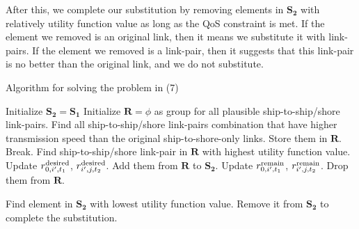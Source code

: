 \documentclass[journal]{IEEEtran}
\begin{document}
   After this, we complete our substitution by removing elements in ${{\mathbf{S}}_{\mathbf{2}}}$ with relatively utility function value as long as the QoS constraint is met. If the element we removed is an original link, then it means we substitute it with link-pairs. If the element we removed is a link-pair, then it suggests that this link-pair is no better than the original link, and we do not substitute. 
  
   
   \begin{algorithm}[ht]
   \caption{Algorithm for solving the problem in (7)}
   \begin{algorithmic}[1]
   \STATE Initialize ${{\mathbf{S}}_{\mathbf{2}}}={{\mathbf{S}}_{\mathbf{1}}}$
   \STATE Initialize ${\mathbf{R}} = \phi $ as group for all plausible ship-to-ship/shore link-pairs.
   \STATE Find all ship-to-ship/shore link-pairs combination that have higher transmission speed than the original ship-to-shore-only links. Store them in ${\mathbf{R}}$.
      \STATE Break.
     \ENDIF
     \STATE Find ship-to-ship/shore link-pair in ${\mathbf{R}}$ with highest utility function value. 
     \STATE Update $r_{0,i',{t_1}}^{\rm{desired}}$, $r_{i',j,{t_2}}^{\rm{desired}}$.
      \STATE Add them from ${\mathbf{R}}$ to ${{\mathbf{S}}_{\mathbf{2}}}$.
      \STATE Update $r_{0,i',{t_1}}^{\rm{remain}}$, $r_{i',j,{t_2}}^{\rm{remain}}$.
     \ELSE
     \STATE Drop them from ${\mathbf{R}}$. 
     \ENDIF
     \ENDWHILE
   \ENDFOR
  
     \STATE Find element in ${{\mathbf{S}}_{\mathbf{2}}}$ with lowest utility function value. 
     \STATE Remove it from ${{\mathbf{S}}_{\mathbf{2}}}$ to complete the substitution. 
     
   \ENDWHILE
   \end{algorithmic}
   \end{algorithm}
   
\end{document}
